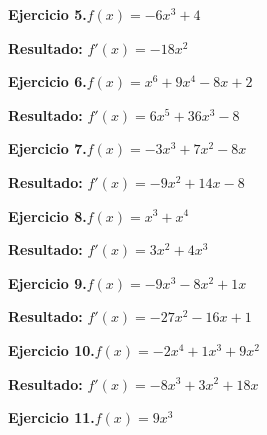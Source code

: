 \documentclass[10pt,a4paper]{article}
\begin{document}
\begin{ejbox}
\textbf{Ejercicio 5.}\quad $f(x) = -6x^{3} +4$
\end{ejbox}

\begin{solbox}
\textbf{Resultado:} \(\displaystyle f'(x) = -18x^{2}\)
\end{solbox}

\begin{ejbox}
\textbf{Ejercicio 6.}\quad $f(x) = x^{6} +9x^{4} -8x +2$
\end{ejbox}

\begin{solbox}
\textbf{Resultado:} \(\displaystyle f'(x) = 6x^{5} +36x^{3} -8\)
\end{solbox}

\newpage
\begin{ejbox}
\textbf{Ejercicio 7.}\quad $f(x) = -3x^3 +7x^2 -8x$
\end{ejbox}

\begin{solbox}
\textbf{Resultado:} \(\displaystyle f'(x) = -9x^2 +14x -8\)
\end{solbox}

\begin{ejbox}
\textbf{Ejercicio 8.}\quad $f(x) = x^{3} + x^{4}$
\end{ejbox}

\begin{solbox}
\textbf{Resultado:} \(\displaystyle f'(x) = 3x^{2} + 4x^{3}\)
\end{solbox}

\begin{ejbox}
\textbf{Ejercicio 9.}\quad $f(x) = -9x^{3} -8x^2 +1x$
\end{ejbox}

\begin{solbox}
\textbf{Resultado:} \(\displaystyle f'(x) = -27x^{2} -16x +1\)
\end{solbox}

\newpage
\begin{ejbox}
\textbf{Ejercicio 10.}\quad $f(x) = -2x^4 +1x^3 +9x^2$
\end{ejbox}

\begin{solbox}
\textbf{Resultado:} \(\displaystyle f'(x) = -8x^3 +3x^2 +18x\)
\end{solbox}

\begin{ejbox}
\textbf{Ejercicio 11.}\quad $f(x) = 9x^{3}$
\end{ejbox}
\end{document}
